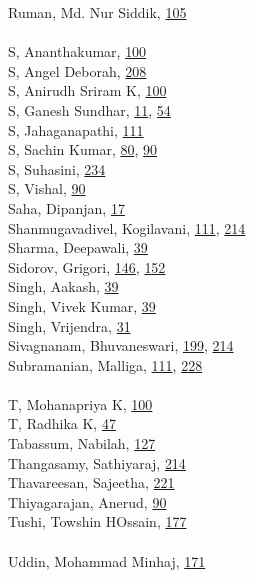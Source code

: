 \documentclass[11pt,oneside]{book}
\begin{document}
\begin{multicols}{2}
Ruman, Md. Nur Siddik, \hyperlink{page.105}{105}\\
\\ %
S, Ananthakumar, \hyperlink{page.100}{100}\\
S, Angel Deborah, \hyperlink{page.208}{208}\\
S, Anirudh Sriram K, \hyperlink{page.100}{100}\\
S, Ganesh Sundhar, \hyperlink{page.11}{11}, \hyperlink{page.54}{54}\\
S, Jahaganapathi, \hyperlink{page.111}{111}\\
S, Sachin Kumar, \hyperlink{page.80}{80}, \hyperlink{page.90}{90}\\
S, Suhasini, \hyperlink{page.234}{234}\\
S, Vishal, \hyperlink{page.90}{90}\\
Saha, Dipanjan, \hyperlink{page.17}{17}\\
Shanmugavadivel, Kogilavani, \hyperlink{page.111}{111}, \hyperlink{page.214}{214}\\
Sharma, Deepawali, \hyperlink{page.39}{39}\\
Sidorov, Grigori, \hyperlink{page.146}{146}, \hyperlink{page.152}{152}\\
Singh, Aakash, \hyperlink{page.39}{39}\\
Singh, Vivek Kumar, \hyperlink{page.39}{39}\\
Singh, Vrijendra, \hyperlink{page.31}{31}\\
Sivagnanam, Bhuvaneswari, \hyperlink{page.199}{199}, \hyperlink{page.214}{214}\\
Subramanian, Malliga, \hyperlink{page.111}{111}, \hyperlink{page.228}{228}\\
\\ %
T, Mohanapriya K, \hyperlink{page.100}{100}\\
T, Radhika K, \hyperlink{page.47}{47}\\
Tabassum, Nabilah, \hyperlink{page.127}{127}\\
Thangasamy, Sathiyaraj, \hyperlink{page.214}{214}\\
Thavareesan, Sajeetha, \hyperlink{page.221}{221}\\
Thiyagarajan, Anerud, \hyperlink{page.90}{90}\\
Tushi, Towshin HOssain, \hyperlink{page.177}{177}\\
\\ %
Uddin, Mohammad Minhaj, \hyperlink{page.171}{171}\\

\end{multicols}
\end{document}
